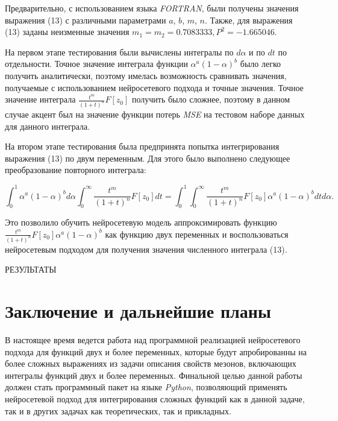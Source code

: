 \documentclass[a4paper,12pt]{article} %
\begin{document}
Предварительно, с использованием языка \textit{FORTRAN}, были получены значения выражения (13) с различными параметрами $a$, $b$, $m$, $n$. Также, для  выражения (13) заданы неизменные значения $m_1 = m_2 = 0.7083333, P^2 = -1.665046$. 

На первом этапе тестирования были вычислены интегралы по $d\alpha$ и по $dt$ по отдельности. Точное значение интеграла функции $\alpha^{a}(1 - \alpha)^b$ было легко получить аналитически, поэтому имелась возможность сравнивать значения, получаемые с использованием нейросетевого подхода и точные значения. Точное значение интеграла $\frac{t^m}{(1+t)^n}F[z_{0}]$ получить было сложнее, поэтому в данном случае акцент был на значение функции потерь \textit{MSE} на тестовом наборе данных для данного интеграла.

На втором этапе тестирования была предпринята попытка интегрирования выражения (13) по двум переменным. Для этого было выполнено следующее преобразование повторного интеграла:

\begin{equation}
 \int_{0}^{1} \alpha^{a}(1 - \alpha)^bd\alpha \int_{0}^{\infty}\frac{t^m}{(1+t)^n}F[z_{0}]dt = 
 \int_{0}^{1} \int_{0}^{\infty}\frac{t^m}{(1+t)^n}F[z_{0}]\alpha^{a}(1 - \alpha)^bdtd\alpha .
\end{equation}

Это позволило обучить нейросетевую модель аппроксимировать функцию $\frac{t^m}{(1+t)^n}F[z_{0}]\alpha^{a}(1 - \alpha)^b$ как функцию двух переменных и воспользоваться нейросетевым подходом для получения значения численного интеграла (13).

РЕЗУЛЬТАТЫ

\section{Заключение и дальнейшие планы}

В настоящее время ведется работа над программной реализацией нейросетевого подхода для функций двух и более переменных, которые будут апробированны на более сложных выражениях из задачи описания свойств мезонов, включающих интегралы функций двух и более переменных. Финальной целью данной работы должен стать программный пакет на языке \textit{Python}, позволяющий применять нейросетевой подход для интегрирования сложных функций как в данной задаче, так и в других задачах как теоретических, так и прикладных.

\printbibliography[
heading=bibintoc,
title={Список литературы}
]
\end{document}

